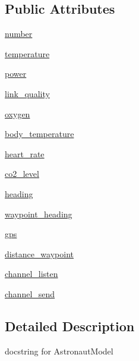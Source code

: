 \subsection*{Public Attributes}
\begin{DoxyCompactItemize}
\item 
\hyperlink{classmodel_1_1AstronautModel_1_1AstronautModel_a4f53c5ecfab0292c870d6d8109dacf89}{number}
\item 
\hyperlink{classmodel_1_1AstronautModel_1_1AstronautModel_a396e8b794abeaa7215635523cb03dfb7}{temperature}
\item 
\hyperlink{classmodel_1_1AstronautModel_1_1AstronautModel_a2516ceb31bd5b7af3f4a4d615fad9d11}{power}
\item 
\hyperlink{classmodel_1_1AstronautModel_1_1AstronautModel_a1e054c96ae8431b5f680e7503fe1d72e}{link\+\_\+quality}
\item 
\hyperlink{classmodel_1_1AstronautModel_1_1AstronautModel_a8b5703cbff5b56b1330d1597df28d4f2}{oxygen}
\item 
\hyperlink{classmodel_1_1AstronautModel_1_1AstronautModel_a27568e6a53f8d25875a6f67127e5f25a}{body\+\_\+temperature}
\item 
\hyperlink{classmodel_1_1AstronautModel_1_1AstronautModel_a8bb48117aeee964c627cbdeb7ad89bb5}{heart\+\_\+rate}
\item 
\hyperlink{classmodel_1_1AstronautModel_1_1AstronautModel_a7aca719fe9b712ba6324cf4d337b4ae3}{co2\+\_\+level}
\item 
\hyperlink{classmodel_1_1AstronautModel_1_1AstronautModel_ad1d5c89f4de67fac9f2650edd005e56c}{heading}
\item 
\hyperlink{classmodel_1_1AstronautModel_1_1AstronautModel_a11d42f7b1a897c25839765d6c4c550a3}{waypoint\+\_\+heading}
\item 
\hyperlink{classmodel_1_1AstronautModel_1_1AstronautModel_abf02b7ed56257208a86696d19281568f}{gps}
\item 
\hyperlink{classmodel_1_1AstronautModel_1_1AstronautModel_a84e0cb015b842911625adacccca25047}{distance\+\_\+waypoint}
\item 
\hyperlink{classmodel_1_1AstronautModel_1_1AstronautModel_a852a19df188c9e688ab50fc317fca5d9}{channel\+\_\+listen}
\item 
\hyperlink{classmodel_1_1AstronautModel_1_1AstronautModel_ab727ba1d9681bd7e10dad56fafa33ccd}{channel\+\_\+send}
\end{DoxyCompactItemize}


\subsection{Detailed Description}
\begin{DoxyVerb}docstring for AstronautModel\end{DoxyVerb}
 


